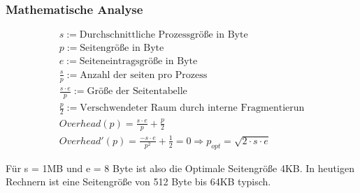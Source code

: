 \subsubsection*{Mathematische Analyse}

\begin{align*}
    s := \text{Durchschnittliche Prozessgröße in Byte} \\
    p := \text{Seitengröße in Byte} \\
    e := \text{Seiteneintragsgröße in Byte} \\
    \frac{s}{p} := \text{Anzahl der seiten pro Prozess} \\
    \frac{s \cdot e}{p} := \text{Größe der Seitentabelle} \\
    \frac{p}{2} := \text{Verschwendeter Raum durch interne Fragmentierun} \\
    Overhead(p) = \frac{s \cdot e}{p} + \frac{p}{2} \\
    Overhead'(p) = \frac{- s \cdot e}{p^2} + \frac{1}{2} = 0 \Rightarrow p_{opt} = \sqrt{2 \cdot s \cdot e}
\end{align*}

Für s = 1MB und e = 8 Byte ist also die Optimale Seitengröße 4KB. In heutigen Rechnern ist eine Seitengröße von 512 Byte bis 64KB typisch.